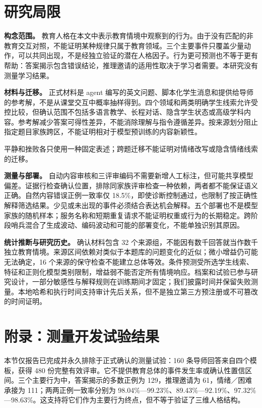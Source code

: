 \documentclass[11pt,a4paper,UTF8]{ctexart}
\begin{document}
\section{研究局限}

\textbf{构念范围。} 教育人格在本文中表示教育情境中观察到的行为。由于没有匹配的非教育交互对照，不能证明某种规律只属于教育领域。三个主要事件只覆盖少量动作，可以共同出现，不是经独立验证的潜在人格因子。行为更可预测也不等于更有帮助：答案揭示包含错误结论，推理邀请的适用性取决于学习者需要。本研究没有测量学习结果。

\textbf{材料与迁移。} 正式材料是 agent 编写的英文问题、脚本化学生消息和提供给导师的参考解，不是从课堂交互中概率抽样得到。四个领域和两类明确学生线索允许受控比较，但确认范围不包括多语言教学、长程对话、隐含学生状态或高级学科内容。参考解减少答案可得性差异，不能消除理解与指令遵循差异。按来源划分阻止指定题目家族跨区，不能证明相对于模型预训练的内容新颖性。

平静和挫败各只使用一种固定表述；跨题迁移不能证明对情绪改写或隐含情绪线索的迁移。

\textbf{测量与部署。} 自动内容审核和三评审编码不需要新增人工标注，但可能共享模型偏差。证据行检查确认位置，排除同家族评审检查一种依赖，两者都不能保证语义正确。自然内容错误正例一致率仅 18.5\%，即使诊断控制通过，也限制了按正确性解释筛选结果。少见或未出现的事件必须结合表达机会解释。五个部署也不是模型家族的随机样本；服务名称和短期重复请求不能证明权重或行为的长期稳定。跨阶段哨兵混合了生成波动、编码波动和可能的部署变化，不能单独识别其原因。

\textbf{统计推断与研究历史。} 确认材料包含 32 个来源组，不能因有数千回答就当作数千独立教育情境。来源区间依赖对类似于本题库的问题变化的近似；微小增益仍可能无法确定，16 个来源的保守检查不能建立总体等效。条件预测受所选学生线索、特征和正则化模型类别限制，增益弱不能否定所有情境响应。档案和试验已参与研究设计，一部分敏感性与解释规则在训练期间才固定；我们披露时间并保留失败测量。本地哈希和执行时间支持审计先后关系，但不是独立第三方预注册或不可篡改的时间证明。

\section{附录：测量开发试验结果}

本节仅报告已完成并永久排除于正式确认的测量试验：160 条导师回答来自四个模板，获得 480 份完整有效评审。它不提供教育总体的事件发生率或确认性置信区间。三个主要行为中，答案揭示的多数正例为 129，推理邀请为 61，情绪／困难承接为 111；两两正例一致率分别为 98.04\%—99.23\%、89.43\%—92.19\%、97.32\%—98.63\%。这支持将它们作为主要行为终点，但不等于验证了三维人格结构。
\end{document}
